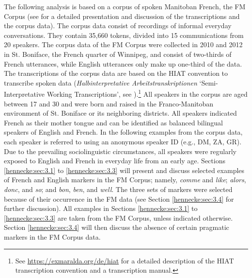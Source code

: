 \documentclass[output=paper]{langscibook}
\begin{document}
The following analysis is based on a corpus of spoken Manitoban French, the FM Corpus (see \citealt{Hennecke.2014} for a detailed presentation and discussion of the transcriptions and the corpus data). The corpus data consist of recordings of informal everyday conversations. They contain 35,660 tokens, divided into 15 communications from 20 speakers. The corpus data of the FM Corpus were collected in 2010 and 2012 in St. Boniface, the French quarter of Winnipeg, and consist of two-thirds of French utterances, while English utterances only make up one-third of the data. The transcriptions of the corpus data are based on the HIAT convention to transcribe spoken data (\textit{Halbinterpretative Arbeitstranskriptionen} ‘Semi-Interpretative Working Transcriptions', see \cite{Ehlich.1976}).\footnote{See \url{https://exmaralda.org/de/hiat} for a detailed description of the HIAT transcription convention and a transcription manual.} All speakers in the corpus are aged between 17 and 30 and were born and raised in the Franco-Manitoban environment of St. Boniface or its neighboring districts. All speakers indicated French as their mother tongue and can be identified as balanced bilingual speakers of English and French. In the following examples from the corpus data, each speaker is referred to using an anonymous speaker ID (e.g., DM, ZA, GR). Due to the prevailing sociolinguistic circumstances, all speakers were regularly exposed to English and French in everyday life from an early age. Sections \ref{hennecke:sec:3.1} to \ref{hennecke:sec:3.3} will present and discuss selected examples of French and English markers in the FM Corpus; namely, \textit{comme} and \textit{like}; \textit{alors}, \textit{donc}, and \textit{so}; and \textit{bon}, \textit{ben}, and \textit{well}. The three sets of markers were selected because of their occurrence in the FM data (see Section \ref{hennecke:sec:3.4} for further discussion). All examples in Sections \ref{hennecke:sec:3.1} to \ref{hennecke:sec:3.3} are taken from the FM Corpus, unless indicated otherwise. Section \ref{hennecke:sec:3.4} will then discuss the absence of certain pragmatic markers in the FM Corpus data.
\end{document}
